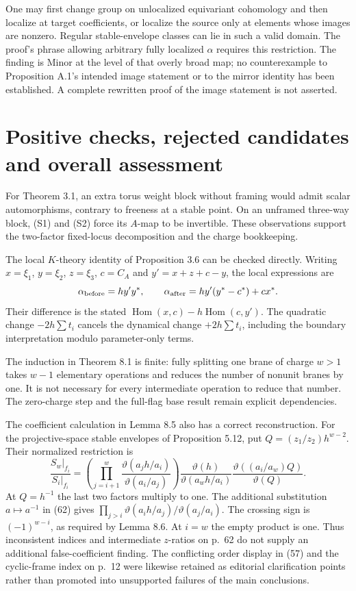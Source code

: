 \documentclass[10pt]{article}
\begin{document}
One may first change group on unlocalized equivariant cohomology and then localize at target coefficients, or localize the source only at elements whose images are nonzero. Regular stable-envelope classes can lie in such a valid domain. The proof’s phrase allowing arbitrary fully localized \(\alpha\) requires this restriction. The finding is Minor at the level of that overly broad map; no counterexample to Proposition A.1’s intended image statement or to the mirror identity has been established. A complete rewritten proof of the image statement is not asserted.\par
\section*{Positive checks, rejected candidates and overall assessment}
For Theorem 3.1, an extra torus weight block without framing would admit scalar automorphisms, contrary to freeness at a stable point. On an unframed three-way block, (S1) and (S2) force its \(A\)-map to be invertible. These observations support the two-factor fixed-locus decomposition and the charge bookkeeping.\par
The local \(K\)-theory identity of Proposition 3.6 can be checked directly. Writing \(x=\xi_1\), \(y=\xi_2\), \(z=\xi_3\), \(c=C_A\) and \(y'=x+z+c-y\), the local expressions are \[\alpha_{\rm before}=h y'y^*,\qquad
 \alpha_{\rm after}=h y'(y^*-c^*)+cx^*.\] Their difference is the stated \(\operatorname{Hom}(x,c)-h\operatorname{Hom}(c,y')\). The quadratic change \(-2h\sum t_i\) cancels the dynamical change \(+2h\sum t_i\), including the boundary interpretation modulo parameter-only terms.\par
The induction in Theorem 8.1 is finite: fully splitting one brane of charge \(w>1\) takes \(w-1\) elementary operations and reduces the number of nonunit branes by one. It is not necessary for every intermediate operation to reduce that number. The zero-charge step and the full-flag base result remain explicit dependencies.\par
The coefficient calculation in Lemma 8.5 also has a correct reconstruction. For the projective-space stable envelopes of Proposition 5.12, put \(Q=(z_1/z_2)h^{w-2}\). Their normalized restriction is \[\frac{S_w|_{f_i}}{S_i|_{f_i}}=
 \left(\prod_{j=i+1}^{w}
 \frac{\vartheta(a_jh/a_i)}{\vartheta(a_i/a_j)}\right)
 \frac{\vartheta(h)}{\vartheta(a_wh/a_i)}
 \frac{\vartheta((a_i/a_w)Q)}{\vartheta(Q)}.\] At \(Q=h^{-1}\) the last two factors multiply to one. The additional substitution \(a\mapsto a^{-1}\) in (62) gives \(\prod_{j>i}\vartheta(a_ih/a_j)/\vartheta(a_j/a_i)\). The crossing sign is \((-1)^{w-i}\), as required by Lemma 8.6. At \(i=w\) the empty product is one. Thus inconsistent indices and intermediate \(z\)-ratios on p. 62 do not supply an additional false-coefficient finding. The conflicting order display in (57) and the cyclic-frame index on p. 12 were likewise retained as editorial clarification points rather than promoted into unsupported failures of the main conclusions.\par
\end{document}
